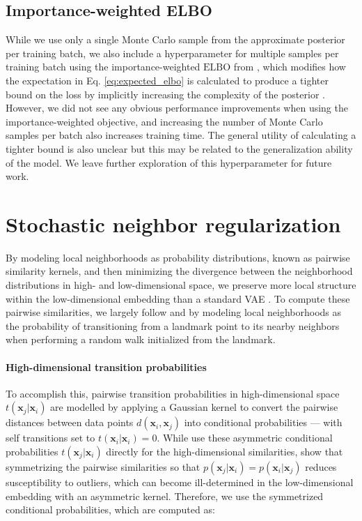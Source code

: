 \documentclass[11pt,a4paper,oneside]{book}
\begin{document}
\begin{doublespace}
\begin{appendices}
\subsection{Importance-weighted ELBO}
\label{appendix:iwae}
While we use only a single Monte Carlo sample from the approximate posterior per training batch, we also include a hyperparameter for multiple samples per training batch using the importance-weighted $\mathrm{ELBO}$ from \cite{burda2015iwae}, which modifies how the expectation in Eq. \ref{eq:expected_elbo} is calculated to produce a tighter bound on the loss by implicitly increasing the complexity of the posterior \citep{cremer2017reinterpreting}. However, we did not see any obvious performance improvements when using the importance-weighted objective, and increasing the number of Monte Carlo samples per batch also increases training time. The general utility of calculating a tighter bound is also unclear \citep{rainforth2018tighter} but this may be related to the generalization ability of the model. We leave further exploration of this hyperparameter for future work.

\section{Stochastic neighbor regularization}
\label{appendix:sne}
By modeling local neighborhoods as probability distributions, known as pairwise similarity kernels, and then minimizing the divergence between the neighborhood distributions in high- and low-dimensional space, we preserve more local structure within the low-dimensional embedding than a standard VAE \citep{ding2018scvis}. To compute these pairwise similarities, we largely follow \cite{hinton2003stochastic} and \cite{maaten2008tsne} by modeling local neighborhoods as the probability of transitioning from a landmark point to its nearby neighbors when performing a random walk initialized from the landmark. 

\paragraph{High-dimensional transition probabilities} To accomplish this, pairwise transition probabilities in high-dimensional space $t(\mathbf{x}_j | \mathbf{x}_i)$ are modelled by applying a Gaussian kernel to convert the pairwise distances between data points $d(\mathbf{x}_i, \mathbf{x}_j)$ into conditional probabilities --- with self transitions set to $t(\mathbf{x}_i | \mathbf{x}_i) = 0$. While \cite{ding2018scvis} use these asymmetric conditional probabilities $t(\mathbf{x}_j | \mathbf{x}_i)$ directly for the high-dimensional similarities, \cite{maaten2008tsne} show that symmetrizing the pairwise similarities so that $p(\mathbf{x}_j | \mathbf{x}_i) = p(\mathbf{x}_i | \mathbf{x}_j)$ reduces susceptibility to outliers, which can become ill-determined in the low-dimensional embedding with an asymmetric kernel. Therefore, we use the symmetrized conditional probabilities, which are computed as:


\end{appendices}
\end{doublespace}
\end{document}
